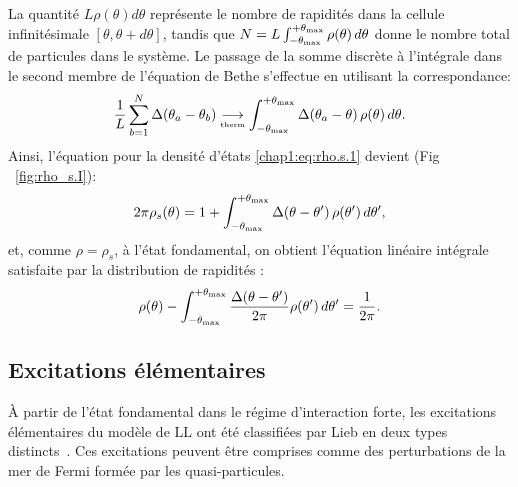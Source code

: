 La quantité \( L \rho(\theta) d\theta \) représente le nombre de rapidités dans la cellule infinitésimale \( [\theta, \theta + d\theta] \), tandis que
\(
	N = L \int_{-\theta_{\mbox{\tiny max}}}^{+\theta_{\mbox{\tiny max}}} \rho(\theta)\, d\theta
\)
donne le nombre total de particules dans le système. Le passage de la somme discrète à l'intégrale dans le second membre de l'équation de Bethe s'effectue en utilisant la correspondance:
\begin{eqnarray}
	\frac{1}{L} \sum_{b = 1}^N \Delta(\theta_a - \theta_b) \underset{\text{\tiny therm}}{\longrightarrow }\int_{-\theta_{\mbox{\tiny max}}}^{+\theta_{\mbox{\tiny max}}} \Delta(\theta_a - \theta)\, \rho(\theta)\, d\theta.
\end{eqnarray}
Ainsi, l'équation pour la densité d'états \eqref{chap1:eq:rho.s.1} devient (Fig ~\ref{fig:rho_s.I}):
\begin{eqnarray}\label{chap.1.rho.s.2}
	2\pi \rho_s(\theta) = 1 + \int_{-\theta_{\mbox{\tiny max}}}^{+\theta_{\mbox{\tiny max}}} \Delta(\theta - \theta')\, \rho(\theta')\, d\theta',
\end{eqnarray}
et, comme \( \rho = \rho_s \), à l'état fondamental, on obtient l’équation linéaire intégrale satisfaite par la distribution de rapidités :
\begin{eqnarray}\label{chap.1.rho.3}
	\rho(\theta) - \int_{-\theta_{\mbox{\tiny max}}}^{+\theta_{\mbox{\tiny max}}} \frac{\Delta(\theta - \theta')}{2\pi} \rho(\theta')\, d\theta' = \frac{1}{2\pi}.
\end{eqnarray}


\subsection{Excitations élémentaires}

À partir de l’état fondamental dans le régime d’interaction forte, les excitations élémentaires du modèle de \gls{LL} ont été classifiées par Lieb en deux types distincts~\cite{LL_1963_2}. Ces excitations peuvent être comprises comme des perturbations de la mer de Fermi formée par les quasi-particules.

